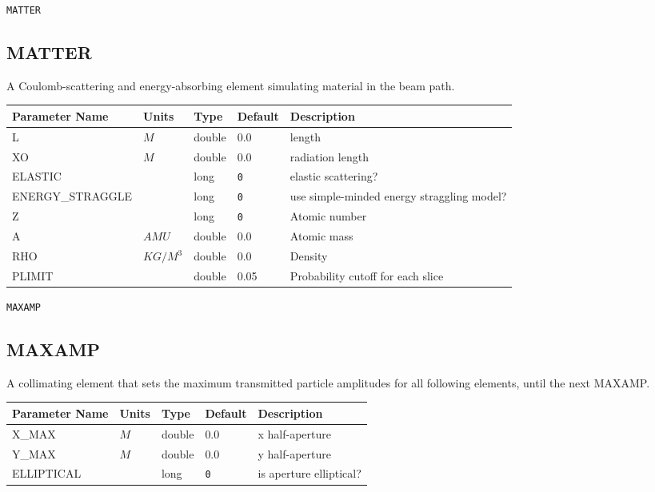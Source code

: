 \vspace*{0.5in}

\begin{latexonly}
\newpage
\begin{center}{\Large\verb|MATTER|}\end{center}
\end{latexonly}\subsection{MATTER}
A Coulomb-scattering and energy-absorbing element simulating material in the
beam path.
\\
\begin{tabular}{|l|l|l|l|p{\descwidth}|} \hline
Parameter Name & Units & Type & Default & Description \\ \hline 
L & $M$ & double &  0.0 & length  \\ \hline 
XO & $M$ & double &  0.0 & radiation length  \\ \hline 
ELASTIC &  & long &  \verb|0| & elastic scattering?  \\ \hline 
ENERGY\_STRAGGLE &  & long &  \verb|0| & use simple-minded energy straggling model?  \\ \hline 
Z &  & long &  \verb|0| & Atomic number  \\ \hline 
A & $AMU$ & double &  0.0 & Atomic mass  \\ \hline 
RHO & $KG/M^3$ & double &  0.0 & Density  \\ \hline 
PLIMIT &  & double &   0.05 & Probability cutoff for each slice  \\ \hline 
\end{tabular}

\vspace*{0.5in}

\begin{latexonly}
\newpage
\begin{center}{\Large\verb|MAXAMP|}\end{center}
\end{latexonly}\subsection{MAXAMP}
A collimating element that sets the maximum transmitted particle amplitudes for
all following elements, until the next MAXAMP.
\\
\begin{tabular}{|l|l|l|l|p{\descwidth}|} \hline
Parameter Name & Units & Type & Default & Description \\ \hline 
X\_MAX & $M$ & double &  0.0 & x half-aperture  \\ \hline 
Y\_MAX & $M$ & double &  0.0 & y half-aperture  \\ \hline 
ELLIPTICAL &  & long &  \verb|0| & is aperture elliptical?  \\ \hline 
\end{tabular}

